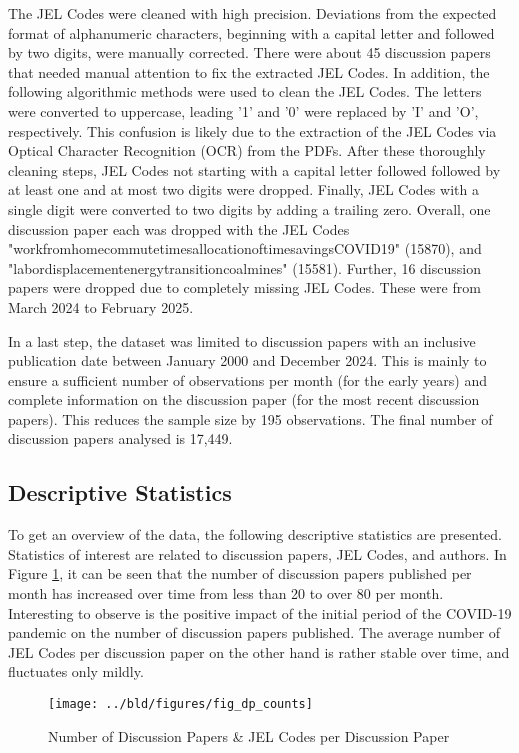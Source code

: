 \documentclass[11pt, a4paper, leqno]{article}
\begin{document}
The JEL Codes were cleaned with high precision.
Deviations from the expected format of alphanumeric characters, beginning with a capital letter and followed by two digits, were manually corrected.
There were about 45 discussion papers that needed manual attention to fix the extracted JEL Codes.
In addition, the following algorithmic methods were used to clean the JEL Codes.
The letters were converted to uppercase, leading '1' and '0' were replaced by 'I' and 'O', respectively.
This confusion is likely due to the extraction of the JEL Codes via Optical Character Recognition (OCR) from the PDFs.
After these thoroughly cleaning steps, JEL Codes not starting with a capital letter followed followed by at least one and at most two digits were dropped.
Finally, JEL Codes with a single digit were converted to two digits by adding a trailing zero.
Overall, one discussion paper each was dropped with the JEL Codes "workfromhomecommutetimesallocationoftimesavingsCOVID19" (15870), and
"labordisplacementenergytransitioncoalmines" (15581).
Further, 16 discussion papers were dropped due to completely missing JEL Codes. These were from March 2024 to February 2025.

In a last step, the dataset was limited to discussion papers with an inclusive publication date between January 2000 and December 2024.
This is mainly to ensure a sufficient number of observations per month (for the early years) and complete information on the discussion paper (for the most recent discussion papers).
This reduces the sample size by 195 observations. The final number of discussion papers analysed is 17,449.

\subsection{Descriptive Statistics}
To get an overview of the data, the following descriptive statistics are presented.
Statistics of interest are related to discussion papers, JEL Codes, and authors.
In Figure \ref{fig:dp_counts}, it can be seen that the number of discussion papers published per month has increased over time from less than 20 to over 80 per month.
Interesting to observe is the positive impact of the initial period of the COVID-19 pandemic on the number of discussion papers published.
The average number of JEL Codes per discussion paper on the other hand is rather stable over time, and fluctuates only mildly.

\begin{figure}
    \centering
    \texttt{[image: ../bld/figures/fig\_dp\_counts]}
    \caption{Number of Discussion Papers \& JEL Codes per Discussion Paper}
    \label{fig:dp_counts}
\end{figure}
\end{document}
